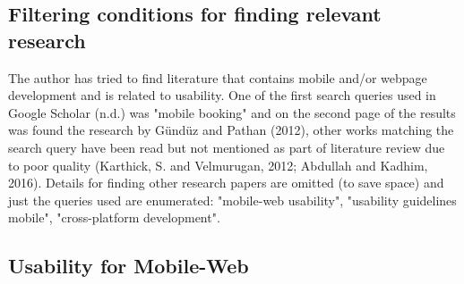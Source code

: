 \documentclass[version=last,fontsize=13pt]{scrartcl}
\begin{document}

\subsection{Filtering conditions for finding relevant research}
	The author has tried to find literature that contains  mobile and/or webpage development and is related to usability. One of the first search queries used in Google Scholar (n.d.) was "mobile booking" and on the second page of the results was found the research by Gündüz and Pathan (2012), other works matching the search query have been read but not mentioned as part of literature review due to poor quality (Karthick, S. and Velmurugan, 2012; Abdullah and Kadhim, 2016). Details for finding other research papers are omitted (to save space) and just the queries used are enumerated:  "mobile-web usability", "usability guidelines mobile", "cross-platform development".

\subsection{Usability for Mobile-Web}
\end{document}
